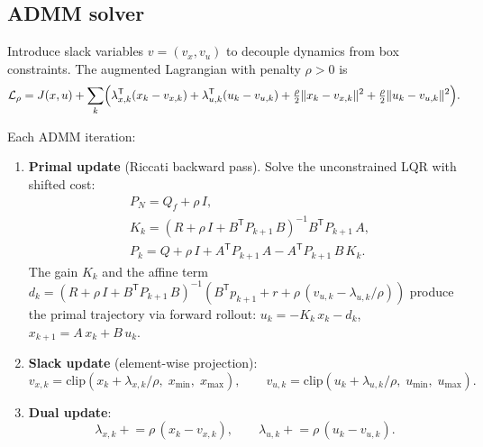 \documentclass[11pt]{article}
\newcommand{\clip}{\mathrm{clip}}
\newcommand{\norm}[1]{\|#1\|}
\newcommand{\trans}{\mathsf{T}}
\begin{document}
\subsection{ADMM solver}\label{ssec:admm}

Introduce slack variables $v = (v_x, v_u)$
to decouple dynamics from box constraints.
The augmented Lagrangian with penalty $\rho > 0$ is
\begin{equation}\label{eq:auglag}
  \mathcal{L}_\rho
  = J(x,u) + \sum_k \Bigl(
    \lambda_{x,k}^\trans(x_k - v_{x,k})
    + \lambda_{u,k}^\trans(u_k - v_{u,k})
    + \tfrac{\rho}{2}\norm{x_k - v_{x,k}}^2
    + \tfrac{\rho}{2}\norm{u_k - v_{u,k}}^2
  \Bigr).
\end{equation}

Each ADMM iteration:
\begin{enumerate}[label=(\roman*), leftmargin=8mm]
  \item \textbf{Primal update}
    (Riccati backward pass).
    Solve the unconstrained LQR with shifted cost:
    \begin{equation}\label{eq:riccati}
    \begin{aligned}
      & P_N = Q_f + \rho\, I, \\
      & K_k = (R + \rho\, I + B^\trans P_{k+1}\, B)^{-1}
              B^\trans P_{k+1}\, A, \\
      & P_k = Q + \rho\, I + A^\trans P_{k+1}\, A
              - A^\trans P_{k+1}\, B\, K_k.
    \end{aligned}
    \end{equation}
    The gain $K_k$ and the affine term
    $d_k = (R + \rho\, I + B^\trans P_{k+1}\, B)^{-1}
    (B^\trans p_{k+1} + r + \rho\,(v_{u,k} - \lambda_{u,k}/\rho))$
    produce the primal trajectory via forward rollout:
    $u_k = -K_k\, x_k - d_k$,
    $x_{k+1} = A\,x_k + B\,u_k$.

  \item \textbf{Slack update}
    (element-wise projection):
    \begin{equation}\label{eq:slack}
      v_{x,k} = \clip(x_k + \lambda_{x,k}/\rho,\;
                       x_{\min},\; x_{\max}),
      \qquad
      v_{u,k} = \clip(u_k + \lambda_{u,k}/\rho,\;
                       u_{\min},\; u_{\max}).
    \end{equation}

  \item \textbf{Dual update}:
    \begin{equation}\label{eq:dual}
      \lambda_{x,k} \mathrel{+}= \rho\,(x_k - v_{x,k}),
      \qquad
      \lambda_{u,k} \mathrel{+}= \rho\,(u_k - v_{u,k}).
    \end{equation}
\end{enumerate}
\end{document}
